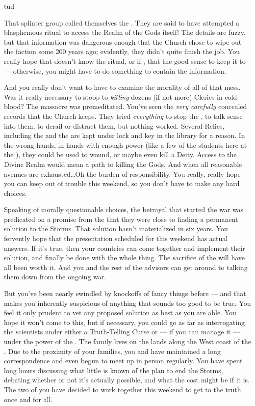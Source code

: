 tud\documentclass[char]{GL2020}
\begin{document}
That splinter group called themselves the \cDisneySect{}. They are said to have attempted a blasphemous ritual to access the Realm of the Gods itself! The details are fuzzy, but that information was dangerous enough that the Church chose to wipe out the faction some 200 years ago; evidently, they didn't quite finish the job. You really hope that \cDisney{} doesn't know the ritual, or if \cDisney{\they} \cDisney{\do}, that \cDisney{\they} \cDisney{\have} the good sense to keep it to \cDisney{\themself} — otherwise, you might have to do something to contain the information. 

And you really don’t want to have to examine the morality of all of that mess. Was it really necessary to stoop to \emph{killing} dozens (if not more) Clerics in cold blood? The massacre was premeditated. You’ve seen the \emph{very carefully} concealed records that the Church keeps. They tried \emph{everything} to stop the \cDisneySect{}, to talk sense into them, to derail or distract them, but nothing worked. Several Relics, including the \iScythe{} and the \iNet{} are kept under lock and key in the \pSc{} library for a reason. In the wrong hands, in hands with enough power (like a few of the students here at the \pSchool{}), they could be used to wound, or maybe even kill a Deity. Access to the Divine Realm would mean a path to killing the Gods. And when all reasonable avenues are exhausted\ldots Oh the burden of responsibility. You really, really hope you can keep \cDisney{} out of trouble this weekend, so you don’t have to make any hard choices.

Speaking of morally questionable choices, the betrayal that started the war was predicated on a promise from the \pTech{} that they were close to finding a permanent solution to the Storms. That solution hasn’t materialized in six years. You fervently hope that the presentation scheduled for this weekend has actual answers.  If it's true, then your countries can come together and implement their solution, and finally be done with the whole thing. The sacrifice of the \pShip{} will have all been worth it. And you and the rest of the advisors can get around to talking them down from the ongoing war.

But you've been nearly swindled by knockoffs of fancy things before — and that makes you inherently suspicious of anything that sounds too good to be true. You feel it only prudent to vet any proposed solution as best as you are able. You hope it won’t come to this, but if necessary, you could go as far as interrogating the scientists under either a Truth-Telling Curse or — if you can manage it — under the power of the \iLariat{}. The \cCurse{\formal} family lives on the \cHedonist{\formal} lands along the West coast of the \pFarm{}. Due to the proximity of your families, you and \cCurse{\full} have maintained a long correspondence and even begun to meet up in person regularly. You have spent long hours discussing what little is known of the \pTech{} plan to end the Storms, debating whether or not it's actually possible, and what the cost might be if it is. The two of you have decided to work together this weekend to get to the truth once and for all. 
\end{document}
